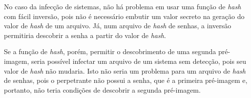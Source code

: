 \documentclass[12pt]{article}
\begin{document}
No caso da infecção de sistemas, não há problema em usar uma função de
\textit{hash} com fácil inversão, pois não é necessário embutir um valor
secreto na geração do valor de \textit{hash} de um arquivo. Já, num arquivo de
\textit{hash} de senhas, a inversão permitiria descobrir a senha a partir do
valor de \textit{hash}.

Se a função de \textit{hash}, porém, permitir o descobrimento de uma segunda
pré-imagem, seria possível infectar um arquivo de um sistema sem detecção, pois
seu valor de \textit{hash} não mudaria. Isto não seria um problema para um
arquivo de \textit{hash} de senhas, pois o perpetrante não possui a senha, que
é a primeira pré-imagem e, portanto, não teria condições de descobrir a segunda
pré-imagem.

%
%
\end{document}
